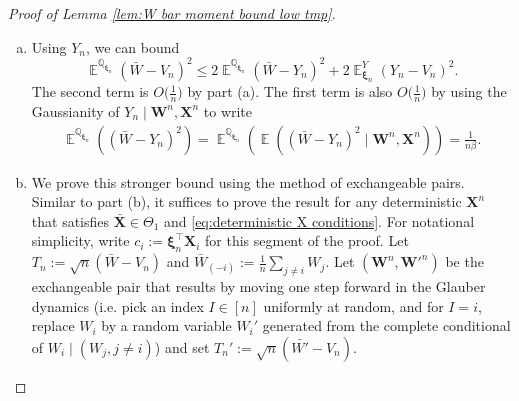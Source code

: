\documentclass[preprint,reqno]{imsart}
\DeclareMathOperator{\ft}{\tilde{\mathnormal f}}
\DeclareMathOperator{\EE}{\mathbb{E}}
\DeclareMathOperator{\QQ}{\mathbb{Q}}
\newcommand{\W}{\mathbf{W}}
\newcommand{\X}{\mathbf{X}}
\newcommand{\xxi}{\boldsymbol \xi}
\begin{document}
\begin{appendix}
\begin{proof}[Proof of Lemma \ref{lem:W bar moment bound low tmp}]
\begin{enumerate}[(a)]
    Now, we add up all bounds in \eqref{eq:integral J_1}, \eqref{eq:integral J_2}, and \eqref{eq:integral J_3} and take $K \to \infty$ to get
    $I_1 \to \int_{-\infty}^{\infty} z^2 e^{-\frac{z^2}{2\sigma^2}} = \sqrt{2 \pi}\sigma^3.$ Note that we are using the trivial lower bound of zero for \eqref{eq:integral J_2} and \eqref{eq:integral J_3}.

    \vspace{2mm}
    To compute the limit of $I_2$, we similarly divide the integral region into 3 parts. By removing the $n(y - V_n)^2$ term in the integrated and using the same bounds, we get
    $$I_2 \to \int_{-\infty}^{\infty} e^{-\frac{z^2}{2 \sigma^2}} dz = \sqrt{2 \pi \sigma^2}.$$
    Hence, 
    $$n \EE(Y_n - V_n)^2= \frac{I_1}{I_2} \to \sigma^2 = \frac{1}{\beta(1 - \beta \alpha_0)}.$$

    The bound $n^{q/2} \EE_{\xxi_n}  |Y_n- V_n|^q \lesssim 1$ can also be similarly derived by representing the expectation as 
    $$\frac{\sqrt{n} \int_{-\infty}^{\infty} |\sqrt{n}(y - V_n)|^q e^{-n(\ft_n(y) - \ft_n(V_n))} dy}{\sqrt{n} \int_{-\infty}^{\infty} e^{-n(\ft_n(y) - \ft_n(V_n))} dy}$$
    and upper bounding the numerator with Normal moments.
    

    


    \item  Using $Y_n$, we can bound
    $$\EE^{\QQ_{\xxi_n}} (\bar{W}- V_n)^2 \le  2\EE^{\QQ_{\xxi_n}} (\bar{W} - Y_n)^2 + 2\EE_{\xxi_n}^{Y}(Y_n - V_n)^2 .$$
    The second term is $O\Big(\frac{1}{n}\Big)$ by part (a). 
    The first term is also $O\Big(\frac{1}{n}\Big)$ by using the Gaussianity of $Y_n \mid \W^n, \X^n$ to write
    \begin{align*}
        \EE^{\QQ_{\xxi_n}} ((\bar{W} - Y_n)^2) = \EE^{\QQ_{\xxi_n}} ( \EE ((\bar{W} - Y_n)^2 \mid \W^n, \X^n)) = \frac{1}{n\beta}.
    \end{align*}

    \item %
    We prove this stronger bound using the method of exchangeable pairs. 
    Similar to part (b), it suffices to prove the result for any deterministic $\X^n$ that satisfies $\bar{\X} \in \Theta_1$ and \eqref{eq:deterministic X conditions}.
    For notational simplicity, write $c_i := \xxi_n^\top \X_i$ for this segment of the proof. Let $T_n := \sqrt{n} (\bar{W} - V_n)$ and $\bar{W}_{(-i)} := \frac{1}{n} \sum_{j \neq i} W_j$. Let $(\W^n, \W'^{n})$ be the exchangeable pair that results by moving one step forward in the Glauber dynamics (i.e. pick an index $I \in [n]$ uniformly at random, and for $I=i$, replace $W_i$ by a random variable $W_i'$ generated from the complete conditional of $W_i \mid (W_j, j \neq i)$) and set $T_n' := \sqrt{n}(\bar{W'}-V_n)$.


\end{enumerate}
\end{proof}
\end{appendix}
\end{document}
